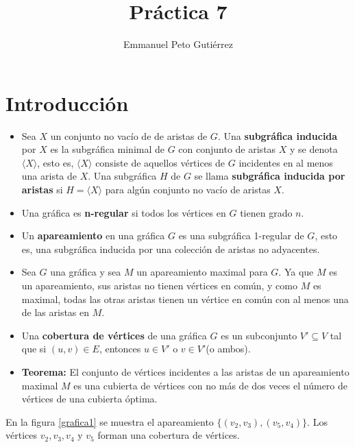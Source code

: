 \documentclass{article}
\title{Práctica 7}
\author{Emmanuel Peto Gutiérrez}
\begin{document}
\maketitle

\section{Introducción}

\begin{itemize}

\item Sea $X$ un conjunto no vacío de de aristas de $G$. Una {\bf subgráfica inducida} por $X$ es la subgráfica minimal de $G$ con conjunto de aristas $X$ y se denota $\langle X \rangle$, esto es, $\langle X \rangle$ consiste de aquellos vértices de $G$ incidentes en al menos una arista de $X$. Una subgráfica $H$ de $G$ se llama {\bf subgráfica inducida por aristas} si $H = \langle X \rangle$ para algún conjunto no vacío de aristas $X$.

\item Una gráfica es {\bf n-regular} si todos los vértices en $G$ tienen grado $n$.

\item Un {\bf apareamiento} en una gráfica $G$ es una subgráfica 1-regular de $G$, esto es, una subgráfica inducida por una colección de aristas no adyacentes.

\item Sea $G$ una gráfica y sea $M$ un apareamiento maximal para $G$. Ya que $M$ es un apareamiento, sus aristas no tienen vértices en común, y como $M$ es maximal, todas las otras aristas tienen un vértice en común con al menos una de las aristas en $M$.

\item Una {\bf cobertura de vértices} de una gráfica $G$ es un subconjunto $V' \subseteq V$ tal que si $(u,v) \in E$, entonces $u \in V'$ o $v \in V'$(o ambos).

\item {\bf Teorema:} El conjunto de vértices incidentes a las aristas de un apareamiento maximal $M$ es una cubierta de vértices con no más de dos veces el número de vértices de una cubierta óptima.

\end{itemize}

En la figura \ref{grafica1} se muestra el apareamiento $\{(v_2 , v_3),(v_5 , v_4)\}$. Los vértices $v_2 , v_3 , v_4$ y $v_5$ forman una cobertura de vértices.
\end{document}
